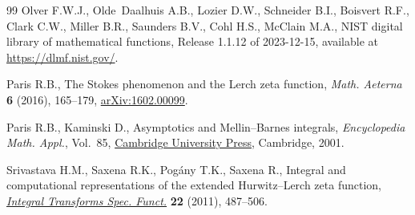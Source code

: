 \documentclass[11pt]{article}
\numberwithin{equation}{section}
\numberwithin{equation}{section}
\begin{document}
\begin{thebibliography}{99}
Olver F.W.J., Olde~Daalhuis A.B., Lozier D.W., Schneider B.I., Boisvert R.F.,
 Clark C.W., Miller B.R., Saunders B.V., Cohl H.S., McClain M.A., NIST digital
 library of mathematical functions, {R}elease 1.1.12 of 2023-12-15, available
 at \url{https://dlmf.nist.gov/}.

Paris R.B., The {S}tokes phenomenon and the {L}erch zeta function,
 \textit{Math. Aeterna} \textbf{6} (2016), 165--179, \href{https://arxiv.org/abs/1602.00099}{arXiv:1602.00099}.

Paris R.B., Kaminski D., Asymptotics and {M}ellin--{B}arnes integrals,
 \textit{Encyclopedia Math. Appl.}, Vol.~85, \href{https://doi.org/10.1017/CBO9780511546662}{Cambridge University Press},
 Cambridge, 2001.

Srivastava H.M., Saxena R.K., Pog\'any T.K., Saxena R., Integral and
 computational representations of the extended {H}urwitz--{L}erch zeta
 function, \href{https://doi.org/10.1080/10652469.2010.530128}{\textit{Integral Transforms Spec. Funct.}} \textbf{22} (2011),
 487--506.

\end{thebibliography}
\end{document}
